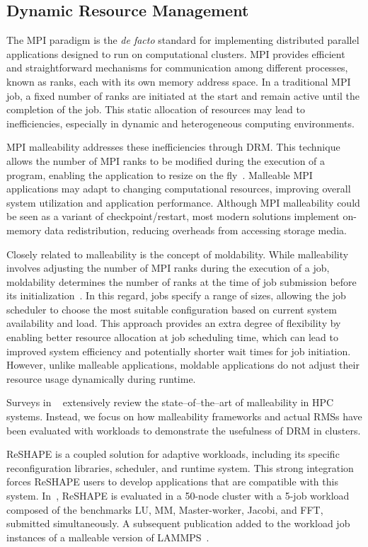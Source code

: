 \documentclass[a4paper,fleqn]{cas-dc}
\begin{document}
\subsection{Dynamic Resource Management}
The MPI paradigm is the {\it de facto} standard for implementing distributed parallel applications designed to run on computational clusters. MPI provides efficient and straightforward mechanisms for communication among different processes, known as ranks, each with its own memory address space.
In a traditional MPI job, a fixed number of ranks are initiated at the start and remain active until the completion of the job. This static allocation of resources may lead to inefficiencies, especially in dynamic and heterogeneous computing environments.

MPI malleability addresses these inefficiencies through DRM. This technique allows the number of MPI ranks to be modified during the execution of a program, enabling the application to resize on the fly~\cite{feitelson_packing_1996}. Malleable MPI applications may adapt to changing computational resources, improving overall system utilization and application performance.
Although MPI malleability could be seen as a variant of checkpoint/restart, most modern solutions implement on-memory data redistribution, reducing overheads from accessing storage media.

Closely related to malleability is the concept of moldability. While malleability involves adjusting the number of MPI ranks during the execution of a job, moldability determines the number of ranks at the time of job submission before its initialization~\cite{lublin_workload_2003}. 
In this regard, jobs specify a range of sizes, allowing the job scheduler to choose the most suitable configuration based on current system availability and load.
This approach provides an extra degree of flexibility by enabling better resource allocation at job scheduling time, which can lead to improved system efficiency and potentially shorter wait times for job initiation. However, unlike malleable applications, moldable applications do not adjust their resource usage dynamically during runtime.

Surveys in ~\cite{aliaga_survey_2022, Tarraf_malleability_2024} extensively review the state--of--the--art of malleability in HPC systems. Instead, we focus on how malleability frameworks and actual RMSs have been evaluated with workloads to demonstrate the usefulness of DRM in clusters.

ReSHAPE is a coupled solution for adaptive workloads, including its specific reconfiguration libraries, scheduler, and runtime system.
This strong integration forces ReSHAPE users to develop applications that are compatible with this system.
In~\cite{sudarsan_reshape_2007}, ReSHAPE is evaluated in a 50-node cluster with a 5-job workload composed of the benchmarks LU, MM, Master-worker, Jacobi, and FFT, submitted simultaneously.
A subsequent publication added to the workload job instances of a malleable version of LAMMPS~\cite{sudarsan_dynamic_2009}.
\end{document}
